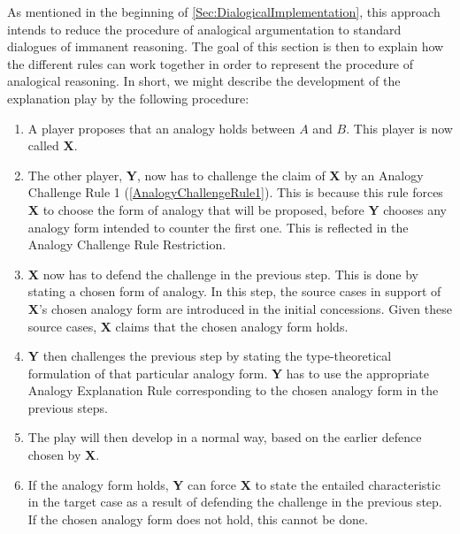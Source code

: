 		As mentioned in the beginning of \autoref{Sec:DialogicalImplementation}, this approach intends to reduce the procedure of analogical argumentation to standard dialogues of immanent reasoning. The goal of this section is then to explain how the different rules can work together in order to represent the procedure of analogical reasoning. In short, we might describe the development of the explanation play by the following procedure:
		\begin{enumerate}
			\item A player proposes that an analogy holds between $A$ and $B$. This player is now called \textbf{X}.
			\item The other player, \textbf{Y}, now has to challenge the claim of \textbf{X} by an Analogy Challenge Rule 1 (\autoref{AnalogyChallengeRule1}). This is because this rule forces \textbf{X} to choose the form of analogy that will be proposed, before \textbf{Y} chooses any analogy form intended to counter the first one. This is reflected in the Analogy Challenge Rule Restriction. 
			\item \textbf{X} now has to defend the challenge in the previous step. This is done by stating a chosen form of analogy. In this step, the source cases in support of \textbf{X}'s chosen analogy form are introduced in the initial concessions. Given these source cases, \textbf{X} claims that the chosen analogy form holds. 
			\item \textbf{Y} then challenges the previous step by stating the type-theoretical formulation of that particular analogy form. \textbf{Y} has to use the appropriate Analogy Explanation Rule corresponding to the chosen analogy form in the previous steps.  
			\item The play will then develop in a normal way, based on the earlier defence chosen by \textbf{X}. 
			\item If the analogy form holds, \textbf{Y} can force \textbf{X} to state the entailed characteristic in the target case as a result of defending the challenge in the previous step. If the chosen analogy form does not hold, this cannot be done.

\end{enumerate}

